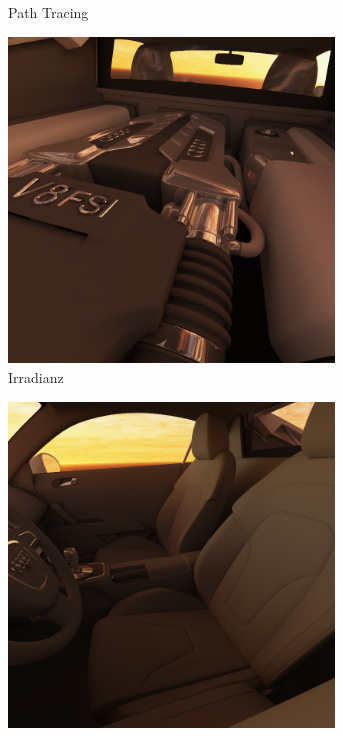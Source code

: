 \begin{figure}[h]
\begin{subfigure}[t]{0.5\textwidth}
				\caption{Path Tracing}
			\end{subfigure}
			\begin{subfigure}[t]{0.5\textwidth}
				\center
				\includegraphics[width=0.95\textwidth]{pic/irr_est-ra-r8_3-irr.png}
				\caption{Irradianz}
			\end{subfigure}
			\begin{subfigure}[t]{0.5\textwidth}
				\center
				\includegraphics[width=0.95\textwidth]{pic/irr_est-ra-r8_4-irr.png}

\end{subfigure}
\end{figure}
